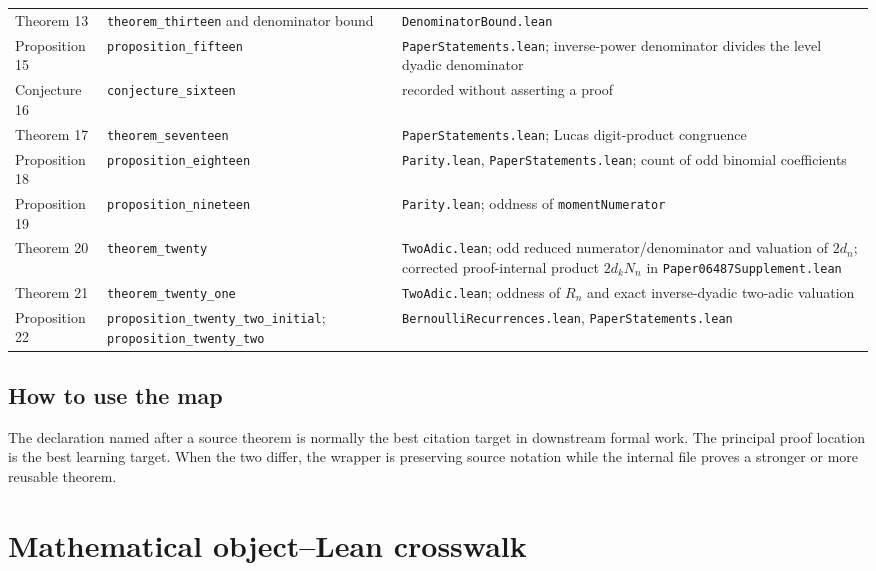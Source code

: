 \documentclass[11pt,oneside]{article}
\theoremstyle{definition}
\theoremstyle{remark}
\begin{document}
\begin{longtable}{>{\raggedright\arraybackslash}p{} >{\raggedright\arraybackslash}p{} >{\raggedright\arraybackslash}p{}}
Theorem 13 & \nolinkurl{theorem_thirteen} and denominator bound & \nolinkurl{DenominatorBound.lean} \\
Proposition 15 & \nolinkurl{proposition_fifteen} & \nolinkurl{PaperStatements.lean}; inverse-power denominator divides the level dyadic denominator \\
Conjecture 16 & \nolinkurl{conjecture_sixteen} & recorded without asserting a proof \\
Theorem 17 & \nolinkurl{theorem_seventeen} & \nolinkurl{PaperStatements.lean}; Lucas digit-product congruence \\
Proposition 18 & \nolinkurl{proposition_eighteen} & \nolinkurl{Parity.lean}, \nolinkurl{PaperStatements.lean}; count of odd binomial coefficients \\
Proposition 19 & \nolinkurl{proposition_nineteen} & \nolinkurl{Parity.lean}; oddness of \nolinkurl{momentNumerator} \\
Theorem 20 & \nolinkurl{theorem_twenty} & \nolinkurl{TwoAdic.lean}; odd reduced numerator/denominator and valuation of \(2d_n\); corrected proof-internal product \(2d_kN_n\) in \nolinkurl{Paper06487Supplement.lean} \\
Theorem 21 & \nolinkurl{theorem_twenty_one} & \nolinkurl{TwoAdic.lean}; oddness of \(R_n\) and exact inverse-dyadic two-adic valuation \\
Proposition 22 & \nolinkurl{proposition_twenty_two_initial}; \nolinkurl{proposition_twenty_two} & \nolinkurl{BernoulliRecurrences.lean}, \nolinkurl{PaperStatements.lean} \\
\bottomrule
\end{longtable}

\subsection{How to use the map}
The declaration named after a source theorem is normally the best citation target in downstream formal work.  The principal proof location is the best learning target.  When the two differ, the wrapper is preserving source notation while the internal file proves a stronger or more reusable theorem.

\section{Mathematical object--Lean crosswalk}\label{app:crosswalk}
\end{document}
